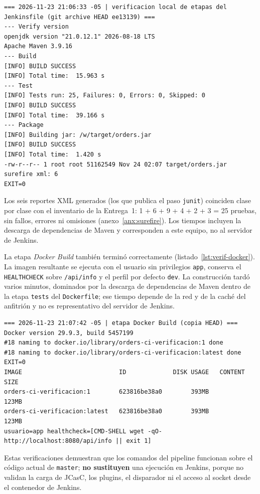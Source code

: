 \documentclass[11pt,a4paper]{article}
\begin{document}
\begin{lstlisting}[caption={Extracto de \texttt{jenkinsfile\_stages\_local.txt}.},label={lst:verif-mvn}]
=== 2026-11-23 21:06:33 -05 | verificacion local de etapas del Jenkinsfile (git archive HEAD ee13139) ===
--- Verify version
openjdk version "21.0.12.1" 2026-08-18 LTS
Apache Maven 3.9.16
--- Build
[INFO] BUILD SUCCESS
[INFO] Total time:  15.963 s
--- Test
[INFO] Tests run: 25, Failures: 0, Errors: 0, Skipped: 0
[INFO] BUILD SUCCESS
[INFO] Total time:  39.166 s
--- Package
[INFO] Building jar: /w/target/orders.jar
[INFO] BUILD SUCCESS
[INFO] Total time:  1.420 s
-rw-r--r-- 1 root root 51162549 Nov 24 02:07 target/orders.jar
surefire xml: 6
EXIT=0
\end{lstlisting}

Los seis reportes XML generados (los que publica el paso \texttt{junit}) coinciden clase por clase con
el inventario de la Entrega~1: 1 + 6 + 9 + 4 + 2 + 3 = 25 pruebas, sin fallos, errores ni omisiones
(anexo~\ref{anx:surefire}). Los tiempos incluyen la descarga de dependencias de Maven y corresponden
a este equipo, no al servidor de Jenkins.

La etapa \emph{Docker Build} también terminó correctamente (listado~\ref{lst:verif-docker}). La
imagen resultante se ejecuta con el usuario sin privilegios \texttt{app}, conserva el
\texttt{HEALTHCHECK} sobre \texttt{/api/info} y el perfil por defecto \texttt{dev}. La construcción
tardó varios minutos, dominados por la descarga de dependencias de Maven dentro de la etapa
\texttt{tests} del \texttt{Dockerfile}; ese tiempo depende de la red y de la caché del anfitrión y no
es representativo del servidor de Jenkins.

\begin{lstlisting}[caption={Extracto de \texttt{docker\_build\_local.txt}.},label={lst:verif-docker}]
=== 2026-11-23 21:07:42 -05 | etapa Docker Build (copia HEAD) ===
Docker version 29.9.3, build 5457199
#18 naming to docker.io/library/orders-ci-verificacion:1 done
#18 naming to docker.io/library/orders-ci-verificacion:latest done
EXIT=0
IMAGE                           ID             DISK USAGE   CONTENT SIZE
orders-ci-verificacion:1        623816be38a0        393MB          123MB
orders-ci-verificacion:latest   623816be38a0        393MB          123MB
usuario=app healthcheck=[CMD-SHELL wget -qO- http://localhost:8080/api/info || exit 1]
\end{lstlisting}

Estas verificaciones demuestran que los comandos del pipeline funcionan sobre el código actual de
\texttt{master}; \textbf{no sustituyen} una ejecución en Jenkins, porque no validan la carga de JCasC,
los plugins, el disparador ni el acceso al socket desde el contenedor de Jenkins.
\end{document}
